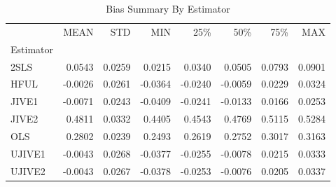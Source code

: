 \begin{table}[ht]
\centering
\caption{Bias Summary By Estimator}
\begin{tabular}{lrrrrrrr}
\toprule
 & MEAN & STD & MIN & 25\% & 50\% & 75\% & MAX \\
Estimator &  &  &  &  &  &  &  \\
\midrule
2SLS & 0.0543 & 0.0259 & 0.0215 & 0.0340 & 0.0505 & 0.0793 & 0.0901 \\
HFUL & -0.0026 & 0.0261 & -0.0364 & -0.0240 & -0.0059 & 0.0229 & 0.0324 \\
JIVE1 & -0.0071 & 0.0243 & -0.0409 & -0.0241 & -0.0133 & 0.0166 & 0.0253 \\
JIVE2 & 0.4811 & 0.0332 & 0.4405 & 0.4543 & 0.4769 & 0.5115 & 0.5284 \\
OLS & 0.2802 & 0.0239 & 0.2493 & 0.2619 & 0.2752 & 0.3017 & 0.3163 \\
UJIVE1 & -0.0043 & 0.0268 & -0.0377 & -0.0255 & -0.0078 & 0.0215 & 0.0333 \\
UJIVE2 & -0.0043 & 0.0267 & -0.0378 & -0.0253 & -0.0076 & 0.0205 & 0.0337 \\
\bottomrule
\end{tabular}
\end{table}
